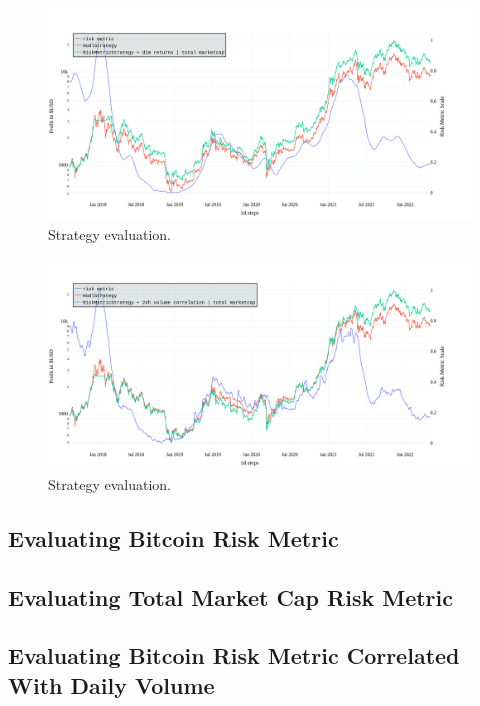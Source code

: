 \begin{figure}[!hbt]
    \centering
    \includegraphics[width=\columnwidth]{figures/strat-eval2.png}
    \caption{Strategy evaluation.}
    \label{figure-strat-eval}
\end{figure}

\begin{figure}[!hbt]
    \centering
    \includegraphics[width=\columnwidth]{figures/strat-eval3.png}
    \caption{Strategy evaluation.}
    \label{figure-strat-eval}
\end{figure}

\subsection*{Evaluating Bitcoin Risk Metric}



\subsection*{Evaluating Total Market Cap Risk Metric}

\subsection*{Evaluating Bitcoin Risk Metric Correlated With Daily Volume}

